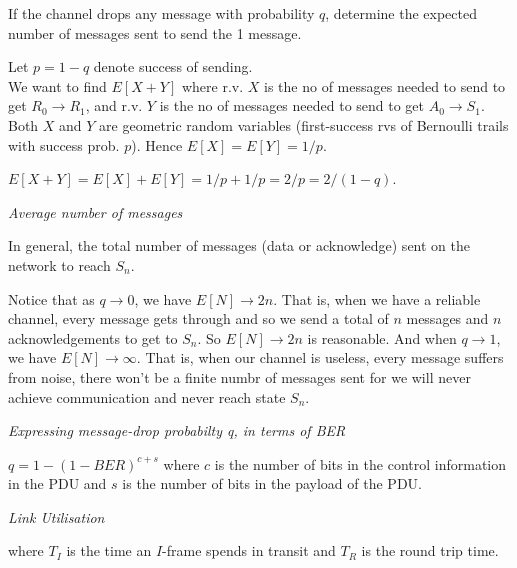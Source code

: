 \frmrule 

\begin{example}
If the channel drops any message with probability $q$, 
determine the expected number of messages sent to send the 1 message.
\end{example}

\frmrule 

Let $p = 1-q$ denote success of sending. \\
We want to find $E[X+Y]$ where r.v. $X$ is the no of messages 
needed to send to get $R_0 \rightarrow R_1$, 
and r.v. $Y$ is the no of messages needed to send to get $A_0 \rightarrow S_1$. 
Both $X$ and $Y$ are geometric random variables 
(first-success rvs of Bernoulli trails with success prob. $p$). 
Hence $E[X] = E[Y] = 1/p$. 

$E[X+Y] = E[X] + E[Y] = 1/p + 1/p = 2/p = 2/(1-q)$.


\frmrule 

\textit{Average number of messages}

In general, the total number of messages (data or acknowledge) 
sent on the network to reach $S_n$.


Notice that as $q \rightarrow 0$, we have $E[N] \rightarrow 2n$. 
That is, when we have a reliable channel, every message gets through 
and so we send a total of $n$ messages and $n$ acknowledgements 
to get to $S_n$. So $E[N] \rightarrow 2n$ is reasonable. 
And when $q \rightarrow 1$, we have $E[N] \rightarrow \infty$. 
That is, when our channel is useless, every message suffers 
from noise, there won't be a finite numbr of messages sent for 
we will never achieve communication and never reach state $S_n$. 


\frmrule 

\textit{Expressing message-drop probabilty q, in terms of BER}

$q = 1-(1-BER)^{c+s}$
where $c$ is the number of bits in the control information in the PDU 
and $s$ is the number of bits in the payload of the PDU. 



\frmrule 

\textit{Link Utilisation}




where $T_I$ is the time an $I$-frame spends in transit 
and $T_R$ is the round trip time.  

